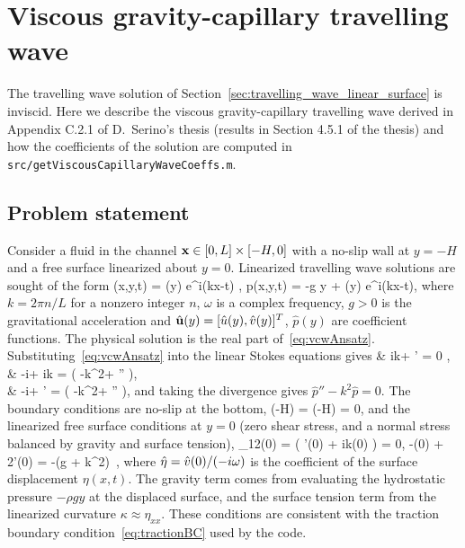 
\clearpage
\section{Viscous gravity-capillary travelling wave} \label{sec:viscous_capillary_wave}

The travelling wave solution of Section~\ref{sec:travelling_wave_linear_surface} is inviscid. Here we describe the viscous
gravity-capillary travelling wave derived in Appendix C.2.1 of D.~Serino's thesis (results in Section 4.5.1 of the thesis) and how the
coefficients of the solution are computed in \texttt{src/getViscousCapillaryWaveCoeffs.m}.

\subsection{Problem statement} \label{sec:vcw_problem}

Consider a fluid in the channel $\mathbf{ x}\in[0,L]\times[-H,0]$ with a no-slip wall at $y=-H$ and a free surface linearized about $y=0$.
Linearized travelling wave solutions are sought of the form
\ba
   \uv(x,y,t) = \hat{\uv}(y) e^{i(kx-\omega t)} , \qquad p(x,y,t) = -\rho g y + (y) e^{i(kx-\omega t)},  \label{eq:vcwAnsatz}
\ea
where $k = 2\pi n/L$ for a nonzero integer $n$, $\omega$ is a complex frequency, $g>0$ is the gravitational acceleration and
$\hat{\mathbf{ u}}(y) = [\hat{u}(y),\hat{v}(y)]^T$, $\hat{p}(y)$ are coefficient functions. The physical solution is the real part of~\eqref{eq:vcwAnsatz}.
Substituting~\eqref{eq:vcwAnsatz} into the linear Stokes equations gives
\bse
\label{eq:vcwODEs}
\bat
   & ik\uHat + \vHat' = 0 , \\
   & -i\omega\rho\uHat + ik = \mu( -k^2\uHat + \uHat'' ), \\
   & -i\omega\rho\vHat + ' = \mu( -k^2\vHat + \vHat'' ),
\eat
\ese
and taking the divergence gives $\hat{p}'' - k^2 \hat{p} = 0$. The boundary conditions are no-slip at the bottom,
\ba
   \uHat(-H) = \vHat(-H) = 0,  \label{eq:vcwNoSlip}
\ea
and the linearized free surface conditions at $y=0$ (zero shear stress, and a normal stress balanced by gravity and surface tension),
\ba
   \hat{\tau}_{12}(0) = \mu\big( \uHat'(0) + ik\vHat(0) \big) = 0, \qquad
   -(0) + 2\mu\vHat'(0) = -(\rho g + \gamma k^2)\, \hat{\eta}, \label{eq:vcwFreeSurface}
\ea
where $\hat{\eta} = \hat{v}(0)/(-i\omega)$ is the coefficient of the surface displacement $\eta(x,t)$. The gravity term comes from evaluating the
hydrostatic pressure $-\rho g y$ at the displaced surface, and the surface tension term from the linearized curvature $\kappa \approx \eta_{xx}$.
These conditions are consistent with the traction boundary condition~\eqref{eq:tractionBC} used by the code.

